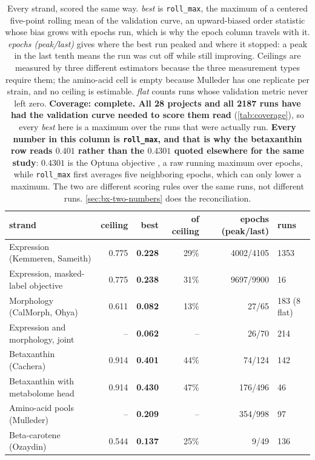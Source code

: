 \begin{table}[htbp]
\centering\small
\begin{tabular}{lrrrrl}
\toprule
strand & ceiling & best & of ceiling & epochs (peak/last) & runs \\
\midrule
Expression (Kemmeren, Sameith) & 0.775 & \textbf{0.228} & 29\% & 4002/4105 & 1353 \\
Expression, masked-label objective & 0.775 & \textbf{0.238} & 31\% & 9697/9900 & 16 \\
Morphology (CalMorph, Ohya) & 0.611 & \textbf{0.082} & 13\% & 27/65 & 183 (8 flat) \\
Expression and morphology, joint & -- & \textbf{0.062} & -- & 26/70 & 214 \\
Betaxanthin (Cachera) & 0.914 & \textbf{0.401} & 44\% & 74/124 & 142 \\
Betaxanthin with metabolome head & 0.914 & \textbf{0.430} & 47\% & 176/496 & 46 \\
Amino-acid pools (Mulleder) & -- & \textbf{0.209} & -- & 354/998 & 97 \\
Beta-carotene (Ozaydin) & 0.544 & \textbf{0.137} & 25\% & 9/49 & 136 \\
\bottomrule
\end{tabular}
\caption[]{Every strand, scored the same way. \emph{best} is \texttt{roll\_max}, the maximum of a centered five-point rolling mean of the validation curve, an upward-biased order statistic whose bias grows with epochs run, which is why the epoch column travels with it. \emph{epochs (peak/last)} gives where the best run peaked and where it stopped: a peak in the last tenth means the run was cut off while still improving. Ceilings are measured by three different estimators because the three measurement types require them; the amino-acid cell is empty because Mulleder has one replicate per strain, and no ceiling is estimable. \emph{flat} counts runs whose validation metric never left zero. \textbf{Coverage: complete. All 28 projects and all 2187 runs have had the validation curve needed to score them read} (\cref{tab:coverage}), so every \emph{best} here is a maximum over the runs that were actually run. \textbf{Every number in this column is \texttt{roll\_max}, and that is why the betaxanthin row reads $0.401$ rather than the $0.4301$ quoted elsewhere for the same study}: $0.4301$ is the Optuna objective , a raw running maximum over epochs, while \texttt{roll\_max} first averages five neighboring epochs, which can only lower a maximum. The two are different scoring rules over the same runs, not different runs. \cref{sec:bx-two-numbers} does the reconciliation.}
\label{tab:strand-summary}
\end{table}
